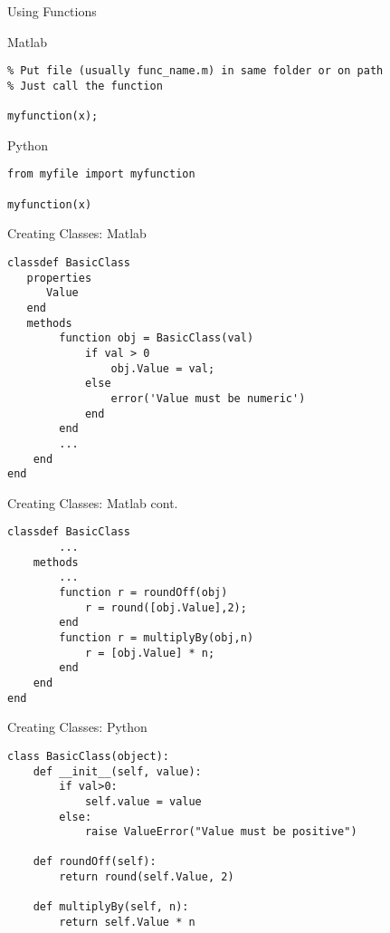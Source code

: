 \documentclass[xcolor={dvipsnames}]{beamer}
\begin{document}
\begin{frame}[fragile]{Using Functions}

\begin{block}{Matlab}
\begin{verbatim}
% Put file (usually func_name.m) in same folder or on path 
% Just call the function

myfunction(x);
\end{verbatim}
\end{block}

\begin{block}{Python}
\begin{verbatim}
from myfile import myfunction

myfunction(x)
\end{verbatim}
\end{block}
\end{frame}

\begin{frame}[fragile]{Creating Classes: Matlab}
\begin{verbatim}
classdef BasicClass
   properties
      Value
   end
   methods
        function obj = BasicClass(val)
            if val > 0
                obj.Value = val;
            else
                error('Value must be numeric')
            end
        end
        ...
    end
end
\end{verbatim}
\end{frame}

\begin{frame}[fragile]{Creating Classes: Matlab cont.}
\begin{verbatim}
classdef BasicClass
        ...
    methods
        ...
        function r = roundOff(obj)
            r = round([obj.Value],2);
        end
        function r = multiplyBy(obj,n)
            r = [obj.Value] * n;
        end
    end
end
\end{verbatim}
\end{frame}

\begin{frame}[fragile]{Creating Classes: Python}
\begin{verbatim}
class BasicClass(object):
    def __init__(self, value):
        if val>0:
            self.value = value
        else:
            raise ValueError("Value must be positive")
            
    def roundOff(self):
        return round(self.Value, 2)
    
    def multiplyBy(self, n):
        return self.Value * n
\end{verbatim}
\end{frame}
\end{document}
